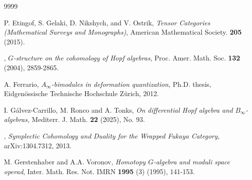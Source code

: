 \documentclass[a4paper, 11pt]{amsart}
\theoremstyle{definition}
\theoremstyle{remark}
\numberwithin{equation}{section}
\begin{document}
\begin{thebibliography}{9999}



 {\sc P. Etingof, S. Gelaki, D. Nikshych, and V. Ostrik},  {\em Tensor Categories (Mathematical
Surveys and Monographs)},  American Mathematical Society. {\bf 205} (2015).


, {\em $G$-structure on the cohomology of Hopf algebras},
Proc. Amer. Math. Soc. {\bf 132} (2004), 2859-2865.

 {\sc A. Ferrario}, {\em $A_{\infty}$-bimodules in deformation quantization,} Ph.D. thesis, Eidgenössische Technische Hochschule Zürich, 2012. 

 {\sc I. Gálvez-Carrillo, M. Ronco and A. Tonks}, {\em On differential Hopf algebra and $B_\infty$-algebras,} Mediterr. J. Math. {\bf 22} (2025), No. 93. 

, {\em Symplectic Cohomology and Duality for the Wrapped Fukaya Category,} arXiv:1304.7312, 2013.







 {\sc M. Gerstenhaber and A.A. Voronov}, {\em Homotopy $G$-algebra and moduli space operad}, Inter. Math. Res. Not. IMRN {\bf 1995} (3) (1995), 141-153.



\end{thebibliography}
\end{document}
